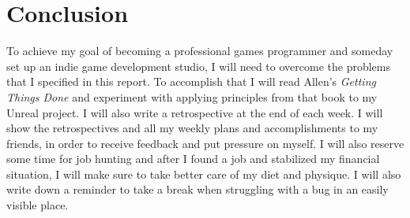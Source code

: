\documentclass{scrartcl}
\begin{document}
\section{Conclusion}

To achieve my goal of becoming a professional games programmer and someday set up an indie game development studio, I will need to overcome the problems that I specified in this report. To accomplish that I will read Allen's \textit{Getting Things Done} and experiment with applying principles from that book to my Unreal project. I will also write a retrospective at the end of each week. I will show the retrospectives and all my weekly plans and accomplishments to my friends, in order to receive feedback and put pressure on myself. I will also reserve some time for job hunting and after I found a job and stabilized my financial situation, I will make sure to take better care of my diet and physique. I will also write down a reminder to take a break when struggling with a bug in an easily visible place.



\end{document}
